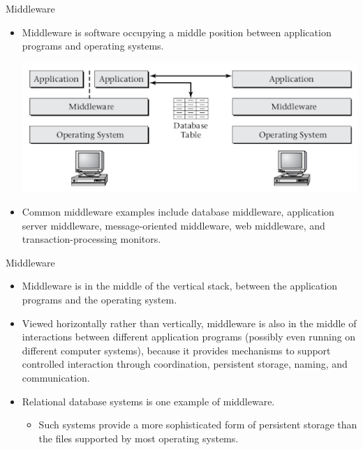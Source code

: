 \documentclass[compress,11pt,xcolor=svgnames,aspectratio=169]{beamer}
\begin{document}
\begin{frame}[t]{Middleware}

\begin{itemize}
\setlength\itemsep{0.4cm}

  \item Middleware is software occupying a middle position between application programs and operating systems.

  \begin{center}
  \includegraphics[scale=0.5]{fig/middleware}
  \end{center}

  \item Common middleware examples include database middleware, application server middleware, message-oriented middleware, web middleware, and transaction-processing monitors.

\end{itemize}

\end{frame}

\begin{frame}[t]{Middleware}

\begin{itemize}
\setlength\itemsep{0.4cm}

  \item Middleware is in the middle of the vertical stack, between the application programs and the operating system.

  \item Viewed horizontally rather than vertically, middleware is also in the middle of interactions between different application programs (possibly even running on different computer systems), because it provides mechanisms to support controlled interaction through coordination, persistent storage, naming, and communication.

  \item Relational database systems is one example of middleware.

  \begin{itemize}
    \item Such systems provide a more sophisticated form of persistent storage than the files supported by most operating systems.
  \end{itemize}

\end{itemize}

\end{frame}
\end{document}
